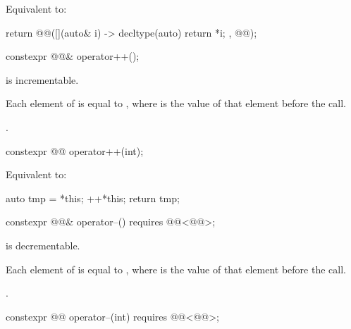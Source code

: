 \begin{itemdescr}
\pnum
\effects
Equivalent to:
\begin{codeblock}
return @@([](auto& i) -> decltype(auto) { return *i; }, @@);
\end{codeblock}
\end{itemdescr}

%
\begin{itemdecl}
constexpr @@& operator++();
\end{itemdecl}

\begin{itemdescr}
\pnum
\expects
{} is incrementable.

\pnum
\ensures
Each element of  is equal to ,
where  is the value of that element before the call.

\pnum
\returns
{}.
\end{itemdescr}

%
\begin{itemdecl}
constexpr @@ operator++(int);
\end{itemdecl}

\begin{itemdescr}
\pnum
\effects
Equivalent to:
\begin{codeblock}
auto tmp = *this;
++*this;
return tmp;
\end{codeblock}
\end{itemdescr}

%
\begin{itemdecl}
constexpr @@& operator--() requires @@<@@>;
\end{itemdecl}

\begin{itemdescr}
\pnum
\expects
{} is decrementable.

\pnum
\ensures
Each element of  is equal to ,
where  is the value of that element before the call.

\pnum
\returns
{}.
\end{itemdescr}

%
\begin{itemdecl}
constexpr @@ operator--(int) requires @@<@@>;
\end{itemdecl}


